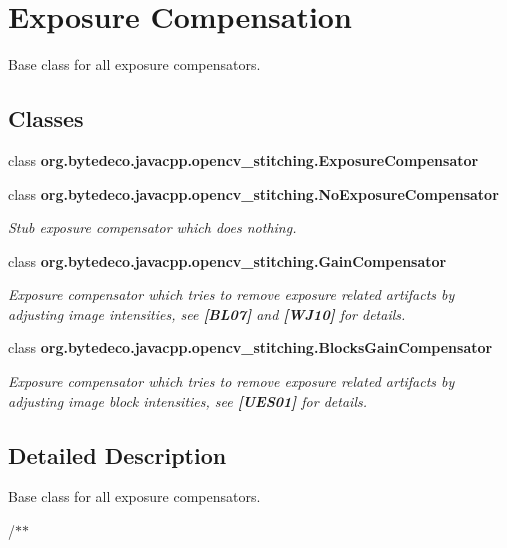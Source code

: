 \hypertarget{group__stitching__exposure}{}\section{Exposure Compensation}
\label{group__stitching__exposure}


Base class for all exposure compensators.  


\subsection*{Classes}
\begin{DoxyCompactItemize}
\item 
class {\bfseries org.\+bytedeco.\+javacpp.\+opencv\+\_\+stitching.\+Exposure\+Compensator}
\item 
class {\bfseries org.\+bytedeco.\+javacpp.\+opencv\+\_\+stitching.\+No\+Exposure\+Compensator}
\begin{DoxyCompactList}\small\item\em Stub exposure compensator which does nothing. \end{DoxyCompactList}\item 
class {\bfseries org.\+bytedeco.\+javacpp.\+opencv\+\_\+stitching.\+Gain\+Compensator}
\begin{DoxyCompactList}\small\item\em Exposure compensator which tries to remove exposure related artifacts by adjusting image intensities, see {\bfseries [B\+L07]} and {\bfseries [W\+J10]} for details. \end{DoxyCompactList}\item 
class {\bfseries org.\+bytedeco.\+javacpp.\+opencv\+\_\+stitching.\+Blocks\+Gain\+Compensator}
\begin{DoxyCompactList}\small\item\em Exposure compensator which tries to remove exposure related artifacts by adjusting image block intensities, see {\bfseries [U\+E\+S01]} for details. \end{DoxyCompactList}\end{DoxyCompactItemize}


\subsection{Detailed Description}
Base class for all exposure compensators. 

/$\ast$$\ast$ 